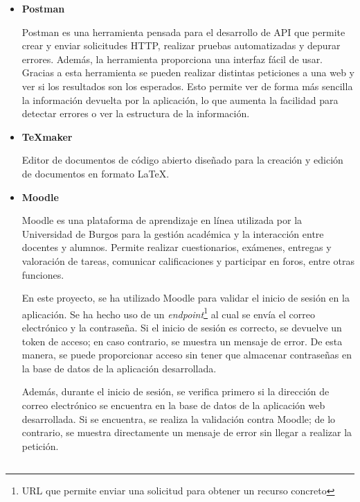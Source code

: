 \begin{itemize}
\item\textbf{Postman}

Postman es una herramienta pensada para el desarrollo de API que permite crear y enviar solicitudes HTTP, realizar pruebas automatizadas y depurar errores.
Además, la herramienta proporciona una interfaz fácil de usar.
Gracias a esta herramienta se pueden realizar distintas peticiones a una web y ver si los resultados son los esperados.
Esto permite ver de forma más sencilla la información devuelta por la aplicación, lo que aumenta la facilidad para detectar errores o ver la estructura de la información.

\item\textbf{\TeX{}maker}

Editor de documentos de código abierto diseñado para la creación y edición de documentos en formato \LaTeX.

\item\textbf{Moodle}

Moodle es una plataforma de aprendizaje en línea utilizada por la Universidad de Burgos para la gestión académica y la interacción entre docentes y alumnos. Permite realizar cuestionarios, exámenes, entregas y valoración de tareas, comunicar calificaciones y participar en foros, entre otras funciones.

En este proyecto, se ha utilizado Moodle para validar el inicio de sesión en la aplicación. 
Se ha hecho uso de un \textit{endpoint}\footnote{URL que permite enviar una solicitud para obtener un recurso concreto} al cual se envía el correo electrónico y la contraseña. 
Si el inicio de sesión es correcto, se devuelve un token de acceso; en caso contrario, se muestra un mensaje de error. 
De esta manera, se puede proporcionar acceso sin tener que almacenar contraseñas en la base de datos de la aplicación desarrollada.

Además, durante el inicio de sesión, se verifica primero si la dirección de correo electrónico se encuentra en la base de datos de la aplicación web desarrollada. Si se encuentra, se realiza la validación contra Moodle; de lo contrario, se muestra directamente un mensaje de error sin llegar a realizar la petición.

\end{itemize}
\subsection{}
